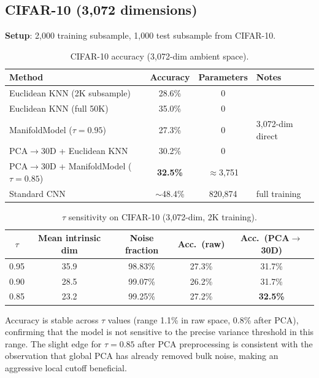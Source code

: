 \documentclass[12pt,letterpaper]{article}
\begin{document}
\subsection{CIFAR-10 (3{,}072 dimensions)}

\textbf{Setup}: 2{,}000 training subsample, 1{,}000 test subsample from CIFAR-10.

\begin{table}[h]
\centering
\caption{CIFAR-10 accuracy (3{,}072-dim ambient space).}
\label{tab:cifar}
\begin{tabular}{lccl}
\toprule
Method & Accuracy & Parameters & Notes \\
\midrule
Euclidean KNN (2K subsample)         & 28.6\% & 0 & \\
Euclidean KNN (full 50K)             & 35.0\% & 0 & \\
ManifoldModel ($\tau{=}0.95$)        & 27.3\% & 0 & 3{,}072-dim direct \\
PCA$\to$30D + Euclidean KNN          & 30.2\% & 0 & \\
PCA$\to$30D + ManifoldModel ($\tau{=}0.85$) & \textbf{32.5\%} & $\approx$3{,}751 & \\
Standard CNN                         & $\sim$48.4\% & 820{,}874 & full training \\
\bottomrule
\end{tabular}
\end{table}

\begin{table}[h]
\centering
\caption{$\tau$ sensitivity on CIFAR-10 (3{,}072-dim, 2K training).}
\label{tab:tau}
\begin{tabular}{ccccc}
\toprule
$\tau$ & Mean intrinsic dim & Noise fraction & Acc.\ (raw) & Acc.\ (PCA$\to$30D) \\
\midrule
0.95 & 35.9 & 98.83\% & 27.3\% & 31.7\% \\
0.90 & 28.5 & 99.07\% & 26.2\% & 31.7\% \\
0.85 & 23.2 & 99.25\% & 27.2\% & \textbf{32.5\%} \\
\bottomrule
\end{tabular}
\end{table}

Accuracy is stable across $\tau$ values (range 1.1\% in raw space, 0.8\% after
PCA), confirming that the model is not sensitive to the precise variance
threshold in this range.  The slight edge for $\tau{=}0.85$ after PCA
preprocessing is consistent with the observation that global PCA has already
removed bulk noise, making an aggressive local cutoff beneficial.
\end{document}
